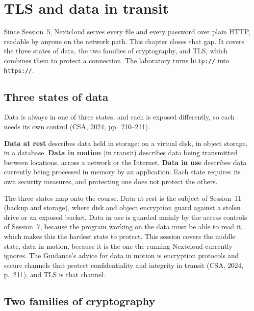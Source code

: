 \chapter{TLS and data in transit}

Since Session~5, Nextcloud serves every file and every password over plain
HTTP, readable by anyone on the network path. This chapter closes that gap.
It covers the three states of data, the two families of cryptography, and
TLS, which combines them to protect a connection. The laboratory turns
\texttt{http://} into \texttt{https://}.

\section{Three states of data}

Data is always in one of three states, and each is exposed differently, so
each needs its own control (CSA, 2024, pp.~210--211).

\begin{definition}\label{def:datastates}
\textbf{Data at rest} describes data held in storage: on a virtual disk, in
object storage, in a database. \textbf{Data in motion} (in transit) describes
data being transmitted between locations, across a network or the Internet.
\textbf{Data in use} describes data currently being processed in memory by an
application. Each state requires its own security measures, and protecting one
does not protect the others.
\end{definition}

The three states map onto the course. Data at rest is the subject of
Session~11 (backup and storage), where disk and object encryption guard
against a stolen drive or an exposed bucket. Data in use is guarded mainly by
the access controls of Session~7, because the program working on the data
must be able to read it, which makes this the hardest state to protect. This
session covers the middle state, data in motion, because it is the one the
running Nextcloud currently ignores. The Guidance's advice for data in
motion is encryption protocols and secure channels that protect
confidentiality and integrity in transit (CSA, 2024, p.~211), and TLS is that
channel.

\section{Two families of cryptography}

